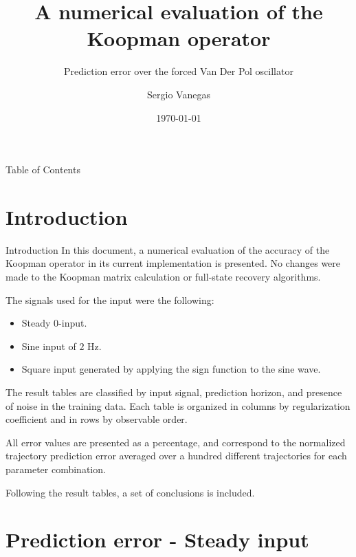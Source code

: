 \documentclass{beamer}
\title[Process]{A numerical evaluation of the Koopman operator}
\subtitle{Prediction error over the forced Van Der Pol oscillator}
\institute[Polimi]{Politecnico di Milano}
\author{Sergio Vanegas}
\date{\today}
\begin{document}
\begin{frame}
    \maketitle
\end{frame}

\begin{frame}{Table of Contents}
    \tableofcontents
\end{frame}


\section{Introduction}

\begin{frame}{Introduction}
    In this document, a numerical evaluation of the accuracy of the Koopman operator in its current implementation is presented. No changes were made to the Koopman matrix calculation or full-state recovery algorithms.

    The signals used for the input were the following:

    \begin{itemize}
        \item Steady 0-input.
        \item Sine input of $2$ Hz.
        \item Square input generated by  applying the sign function to the sine wave.
    \end{itemize}
    
    The result tables are classified by input signal, prediction horizon, and presence of noise in the training data. Each table is organized in columns by regularization coefficient and in rows by observable order. 
    
    All error values are presented as a percentage, and correspond to the normalized trajectory prediction error averaged over a hundred different trajectories for each parameter combination.

    Following the result tables, a set of conclusions is included.
\end{frame}


\section{Prediction error - Steady input}
\end{document}
